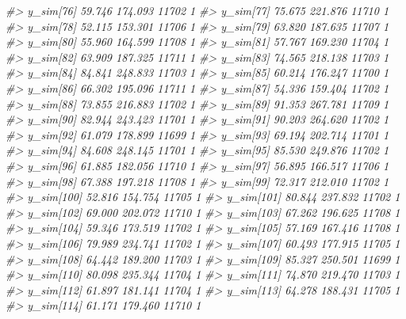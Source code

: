 \documentclass[
  10pt,
  italian,
  a4paper,
  extrafontsizes,onecolumn,openright
  ]{memoir}
\newenvironment{Shaded}{\begin{snugshade}}{\end{snugshade}}
\newcommand{\CommentTok}[1]{\textcolor[rgb]{0.56,0.35,0.01}{\textit{#1}}}
\begin{document}
\begin{Shaded}
\begin{Highlighting}[]
\CommentTok{\#\textgreater{} y\_sim[76]  59.746 174.093 11702    1}
\CommentTok{\#\textgreater{} y\_sim[77]  75.675 221.876 11710    1}
\CommentTok{\#\textgreater{} y\_sim[78]  52.115 153.301 11706    1}
\CommentTok{\#\textgreater{} y\_sim[79]  63.820 187.635 11707    1}
\CommentTok{\#\textgreater{} y\_sim[80]  55.960 164.599 11708    1}
\CommentTok{\#\textgreater{} y\_sim[81]  57.767 169.230 11704    1}
\CommentTok{\#\textgreater{} y\_sim[82]  63.909 187.325 11711    1}
\CommentTok{\#\textgreater{} y\_sim[83]  74.565 218.138 11703    1}
\CommentTok{\#\textgreater{} y\_sim[84]  84.841 248.833 11703    1}
\CommentTok{\#\textgreater{} y\_sim[85]  60.214 176.247 11700    1}
\CommentTok{\#\textgreater{} y\_sim[86]  66.302 195.096 11711    1}
\CommentTok{\#\textgreater{} y\_sim[87]  54.336 159.404 11702    1}
\CommentTok{\#\textgreater{} y\_sim[88]  73.855 216.883 11702    1}
\CommentTok{\#\textgreater{} y\_sim[89]  91.353 267.781 11709    1}
\CommentTok{\#\textgreater{} y\_sim[90]  82.944 243.423 11701    1}
\CommentTok{\#\textgreater{} y\_sim[91]  90.203 264.620 11702    1}
\CommentTok{\#\textgreater{} y\_sim[92]  61.079 178.899 11699    1}
\CommentTok{\#\textgreater{} y\_sim[93]  69.194 202.714 11701    1}
\CommentTok{\#\textgreater{} y\_sim[94]  84.608 248.145 11701    1}
\CommentTok{\#\textgreater{} y\_sim[95]  85.530 249.876 11702    1}
\CommentTok{\#\textgreater{} y\_sim[96]  61.885 182.056 11710    1}
\CommentTok{\#\textgreater{} y\_sim[97]  56.895 166.517 11706    1}
\CommentTok{\#\textgreater{} y\_sim[98]  67.388 197.218 11708    1}
\CommentTok{\#\textgreater{} y\_sim[99]  72.317 212.010 11702    1}
\CommentTok{\#\textgreater{} y\_sim[100] 52.816 154.754 11705    1}
\CommentTok{\#\textgreater{} y\_sim[101] 80.844 237.832 11702    1}
\CommentTok{\#\textgreater{} y\_sim[102] 69.000 202.072 11710    1}
\CommentTok{\#\textgreater{} y\_sim[103] 67.262 196.625 11708    1}
\CommentTok{\#\textgreater{} y\_sim[104] 59.346 173.519 11702    1}
\CommentTok{\#\textgreater{} y\_sim[105] 57.169 167.416 11708    1}
\CommentTok{\#\textgreater{} y\_sim[106] 79.989 234.741 11702    1}
\CommentTok{\#\textgreater{} y\_sim[107] 60.493 177.915 11705    1}
\CommentTok{\#\textgreater{} y\_sim[108] 64.442 189.200 11703    1}
\CommentTok{\#\textgreater{} y\_sim[109] 85.327 250.501 11699    1}
\CommentTok{\#\textgreater{} y\_sim[110] 80.098 235.344 11704    1}
\CommentTok{\#\textgreater{} y\_sim[111] 74.870 219.470 11703    1}
\CommentTok{\#\textgreater{} y\_sim[112] 61.897 181.141 11704    1}
\CommentTok{\#\textgreater{} y\_sim[113] 64.278 188.431 11705    1}
\CommentTok{\#\textgreater{} y\_sim[114] 61.171 179.460 11710    1}

\end{Highlighting}
\end{Shaded}
\end{document}
